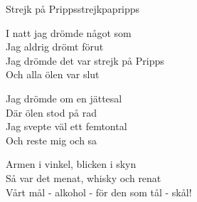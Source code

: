 \begin{song}{Strejk på Pripps}{strejkpapripps}
\begin{vers}
I natt jag drömde något som\\
Jag aldrig drömt förut\\
Jag drömde det var strejk på Pripps\\
Och alla ölen var slut\\
\end{vers}
\begin{vers}
Jag drömde om en jättesal\\
Där ölen stod på rad\\
Jag svepte väl ett femtontal\\
Och reste mig och sa\\
\end{vers}
\begin{vers}
Armen i vinkel, blicken i skyn\\
Så var det menat, whisky och renat\\
Vårt mål - alkohol - för den som tål - skål!\\
\end{vers}
\end{song}
